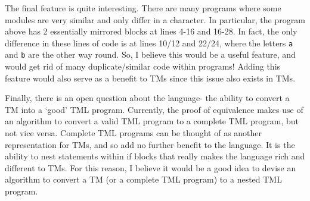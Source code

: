 
The final feature is quite interesting. There are many programs where some modules are very similar and only differ in a character. In particular, the program above has 2 essentially mirrored blocks at lines 4-16 and 16-28. In fact, the only difference in these lines of code is at lines 10/12 and 22/24, where the letters \texttt{a} and \texttt{b} are the other way round. So, I believe this would be a useful feature, and would get rid of many duplicate/similar code within programs! Adding this feature would also serve as a benefit to TMs since this issue also exists in TMs.

Finally, there is an open question about the language- the ability to convert a TM into a `good' TML program. Currently, the proof of equivalence makes use of an algorithm to convert a valid TML program to a complete TML program, but not vice versa. Complete TML programs can be thought of as another representation for TMs, and so add no further benefit to the language. It is the ability to nest statements within if blocks that really makes the language rich and different to TMs. For this reason, I believe it would be a good idea to devise an algorithm to convert a TM (or a complete TML program) to a nested TML program.


